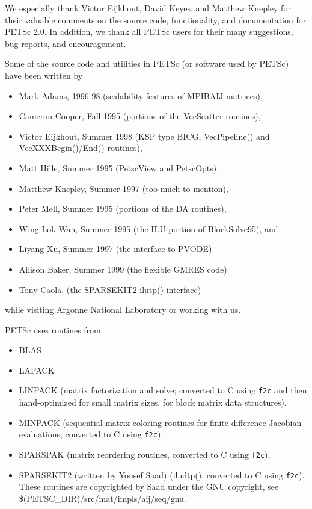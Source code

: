 %
%

\medskip \medskip \noindent
We especially thank Victor Eijkhout, David Keyes, and Matthew Knepley for their valuable 
comments on the 
source code, functionality, and documentation  for PETSc 2.0.  
In addition, we thank all PETSc users for
their many suggestions, bug reports, and encouragement.


\vspace{.3in}
\noindent
Some of the source code and utilities in PETSc (or software used by PETSc)
have been written by 
\begin{itemize}
  \item Mark Adams, 1996-98 (scalability features of MPIBAIJ matrices),
  \item Cameron Cooper, Fall 1995 (portions of the VecScatter routines), 
  \item Victor Eijkhout, Summer 1998 (KSP type BICG, VecPipeline() and VecXXXBegin()/End() routines), 
  \item Matt Hille, Summer 1995 (PetscView and PetscOpts), 
  \item Matthew Knepley, Summer 1997 (too much to mention),
  \item Peter Mell, Summer 1995 (portions of the DA routines),
  \item Wing-Lok Wan, Summer 1995 (the ILU portion of BlockSolve95), and
  \item Liyang Xu, Summer 1997 (the interface to PVODE)
  \item Allison Baker, Summer 1999 (the flexible GMRES code)
  \item Tony Caola, (the SPARSEKIT2 ilutp() interface)
\end{itemize}
while visiting Argonne National Laboratory or working with us.

\vspace{.3in}
\noindent
PETSc uses routines from 
\begin{itemize}
  \item BLAS
  \item LAPACK
  \item LINPACK      (matrix factorization and solve; converted to C using {\tt f2c} and then 
                      hand-optimized for small matrix sizes, for block matrix data structures),
  \item MINPACK      (sequential matrix coloring routines for finite difference Jacobian
                       evaluations; converted to C using {\tt f2c}),
  \item SPARSPAK     (matrix reordering routines, converted to C using {\tt f2c}),
  \item SPARSEKIT2 (written by Yousef Saad) (iludtp(), converted to C using {\tt f2c}). These routines 
                     are copyrighted by Saad under the GNU copyright, see \$(PETSC\_DIR)/src/mat/impls/aij/seq/gnu.
\end{itemize}


